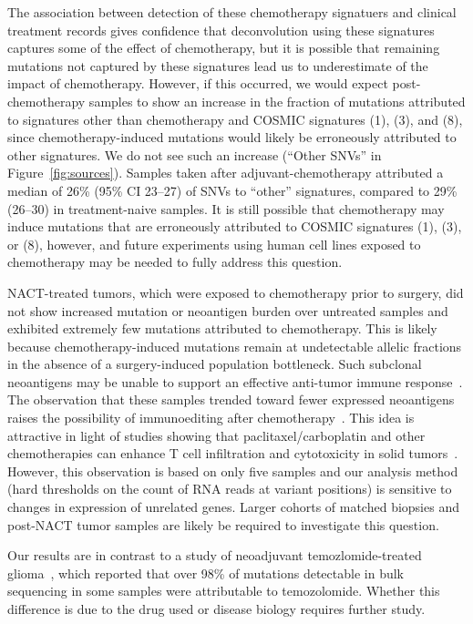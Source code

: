 The association between detection of these chemotherapy signatuers and clinical treatment records gives confidence that deconvolution using these signatures captures some of the effect of chemotherapy, but it is possible that remaining mutations not captured by these signatures lead us to underestimate of the impact of chemotherapy. However, if this occurred, we would expect post-chemotherapy samples to show an increase in the fraction of mutations attributed to signatures other than chemotherapy and COSMIC signatures (1), (3), and (8), since chemotherapy-induced mutations would likely be erroneously attributed to other signatures. We do not see such an increase (``Other SNVs'' in Figure~\ref{fig:sources}). Samples taken after adjuvant-chemotherapy attributed a median of 26\% (95\% CI 23--27) of SNVs to ``other'' signatures, compared to 29\% (26--30) in treatment-naive samples. It is still possible that chemotherapy may induce mutations that are erroneously attributed to COSMIC signatures (1), (3), or (8), however, and future experiments using human cell lines exposed to chemotherapy may be needed to fully address this question. 

NACT-treated tumors, which were exposed to chemotherapy prior to surgery, did not show increased mutation or neoantigen burden over untreated samples and exhibited extremely few mutations attributed to chemotherapy. This is likely because chemotherapy-induced mutations remain at undetectable allelic fractions in the absence of a surgery-induced population bottleneck. Such subclonal neoantigens may be unable to support an effective anti-tumor immune response~\cite{McGranahan_2016}. The observation that these samples trended toward fewer expressed neoantigens raises the possibility of immunoediting after chemotherapy~\cite{Dunn_2002}. This idea is attractive in light of studies showing that paclitaxel/carboplatin and other chemotherapies can enhance T cell infiltration and cytotoxicity in solid tumors~\cite{Demaria2001,Wu_2009,Pfannenstiel_2010,Hodge_2013}. However, this observation is based on only five samples and our analysis method (hard thresholds on the count of RNA reads at variant positions) is sensitive to changes in expression of unrelated genes. Larger cohorts of matched biopsies and post-NACT tumor samples are likely be required to investigate this question.

Our results are in contrast to a study of neoadjuvant temozlomide-treated glioma~\cite{Johnson_2013}, which reported that over 98\% of mutations detectable in bulk sequencing in some samples were attributable to temozolomide. Whether this difference is due to the drug used or disease biology requires further study.

